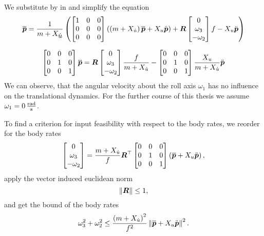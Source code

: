 We substitute \fp by  in  and simplify the equation
\begin{equation}
	\mbox{$\dddot{\bm{p}}$} = 
	\frac{1}{m + X_{\mbox{$\dot{u}$}}}
	\left(
		\begin{bmatrix}
			1 & 0 & 0 \\
			0 & 0 & 0 \\
			0 & 0 & 0
		\end{bmatrix}
		\left(
			\left(m + X_{\dot{u}}\right)
			\mbox{$\dddot{\bm{p}}$}
			+ X_u \mbox{$\ddot{\bm{p}}$}
		\right)
		+
		\mbox{$\bm{R}$}
		\begin{bmatrix}
			0 \\
			\omega_3 \\
			-\omega_2
		\end{bmatrix}
		f
		- X_u \mbox{$\ddot{\bm{p}}$}
	\right)
\end{equation}

\begin{equation}
	\label{eq:jerk-vs-bodyrates}
	\begin{bmatrix}
		0 & 0 & 0\\
		0 & 1 & 0\\
		0 & 0 & 1
	\end{bmatrix}
	\mbox{$\dddot{\bm{p}}$} = 
	\mbox{$\bm{R}$}
	\begin{bmatrix}
		0 \\
		\omega_3 \\
		- \omega_2
	\end{bmatrix}
	\frac{f}{m + X_{\dot{u}}}
	-
	\begin{bmatrix}
		0 & 0 & 0 \\
		0 & 1 & 0 \\
		0 & 0 & 1
	\end{bmatrix}
	\frac{X_u}{m + X_{\dot{u}}}
	\mbox{$\ddot{\bm{p}}$}
\end{equation}
We can observe, that the angular velocity about the roll axis $\omega_1$ has no influence on the translational dynamics. For the further course of this thesis we assume $\omega_1 = \unit[0]{\frac{rad}{s}}$.

To find a criterion for input feasibility with respect to the body rates, we reorder  for the body rates
\begin{equation}
	\begin{bmatrix}
		0 \\
		\omega_3 \\
		- \omega_2
	\end{bmatrix}
	=
	\frac{m + X_{\dot{u}}}{f}
	\mbox{$\bm{R}$}^\top
	\begin{bmatrix}
		0 & 0 & 0 \\
		0 & 1 & 0 \\
		0 & 0 & 1
	\end{bmatrix}
	\left(
		\mbox{$\dddot{\bm{p}}$} + X_u \mbox{$\ddot{\bm{p}}$}
	\right),
\end{equation}
apply the vector induced euclidean norm
\begin{equation}
	\left\lVert\mbox{$\bm{R}$}\right\rVert \leq 1,
\end{equation}
and get the bound of the body rates 
\begin{equation}
	\label{eq:body-rates-bound}
	\omega_3^2 + \omega_2^2 \leq
	\frac{
		\left(
			m + X_{\dot{u}}
		\right)^2
	}{f^2}
	\left\lVert
		\mbox{$\dddot{\bm{p}}$} + X_u \mbox{$\ddot{\bm{p}}$}
	\right\rVert^2
	.
\end{equation}

